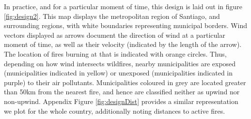 \documentclass[11pt]{article}
\begin{document}
\begin{spacing}{1.3}
In practice, and for a particular moment of time, this design is laid out in figure \ref{fig:design2}.  This map displays the metropolitan region of Santiago, and surrounding regions, with white boundaries representing municipal borders.  Wind vectors displayed as arrows document the direction of wind at a particular moment of time, as well as their velocity (indicated by the length of the arrow).  The location of fires burning at that is indicated with orange circles. Thus, depending on how wind intersects wildfires, nearby municipalities are exposed (municipalities indicated in yellow) or unexposed (municipalities indicated in purple) to their air pollutants. Municipalities coloured in grey are located greater than 50km from the nearest fire, and hence are classified neither as upwind nor non-upwind. Appendix Figure \ref{fig:designDist} provides a similar representation we plot for the whole country, additionally noting distances to active fires.



\end{spacing}
\end{document}

